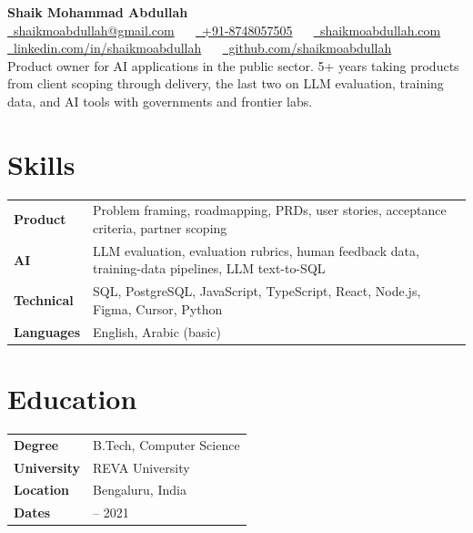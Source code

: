 \documentclass[letterpaper,10.5pt]{article}
\newcommand{\skill}[2]{\textbf{#1} & #2 \\}
\begin{document}
\begin{center}
  {\Huge\bfseries Shaik Mohammad Abdullah}\\[4pt]
  {\footnotesize
    \href{mailto:shaikmoabdullah@gmail.com}{\faEnvelope\ shaikmoabdullah@gmail.com} \ \textbar\ %
    \href{https://wa.me/918748057505}{\faWhatsapp\ +91-8748057505} \ \textbar\ %
    \href{https://shaikmoabdullah.com}{\faGlobe\ shaikmoabdullah.com} \ \textbar\ %
    \href{https://linkedin.com/in/shaikmoabdullah}{\faLinkedin\ linkedin.com/in/shaikmoabdullah} \ \textbar\ %
    \href{https://github.com/shaikmoabdullah}{\faGithub\ github.com/shaikmoabdullah}
  }\\[3pt]
  {\small Product owner for AI applications in the public sector. 5+ years taking products from client scoping through delivery, the last two on LLM evaluation, training data, and AI tools with governments and frontier labs.}
\end{center}

\noindent
\begin{minipage}[t]{0.66\textwidth}
\section{Skills}
\begin{tabularx}{\linewidth}{@{}l >{\raggedright\arraybackslash}X@{}}
  \skill{Product}{Problem framing, roadmapping, PRDs, user stories, acceptance criteria, partner scoping}
  \skill{AI}{LLM evaluation, evaluation rubrics, human feedback data, training-data pipelines, LLM text-to-SQL}
  \skill{Technical}{SQL, PostgreSQL, JavaScript, TypeScript, React, Node.js, Figma, Cursor, Python}
  \skill{Languages}{English, Arabic (basic)}
\end{tabularx}
\end{minipage}\hfill
\begin{minipage}[t]{0.31\textwidth}
\section{Education}
\begin{tabularx}{\linewidth}{@{}l >{\raggedright\arraybackslash}X@{}}
  \skill{Degree}{B.Tech, Computer Science}
  \skill{University}{REVA University}
  \skill{Location}{Bengaluru, India}
  \skill{Dates}{2017 -- 2021}
\end{tabularx}
\end{minipage}
\end{document}
